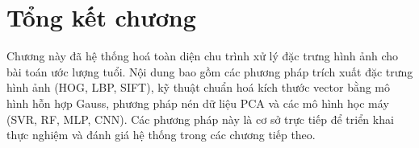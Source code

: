 \section{Tổng kết chương}
Chương này đã hệ thống hoá toàn diện chu trình xử lý đặc trưng hình ảnh cho bài toán ước lượng tuổi. Nội dung bao gồm các phương pháp trích xuất đặc trưng hình ảnh (HOG, LBP, SIFT), kỹ thuật chuẩn hoá kích thước vector bằng mô hình hỗn hợp Gauss, phương pháp nén dữ liệu PCA và các mô hình học máy (SVR, RF, MLP, CNN). Các phương pháp này là cơ sở trực tiếp để triển khai thực nghiệm và đánh giá hệ thống trong các chương tiếp theo.
